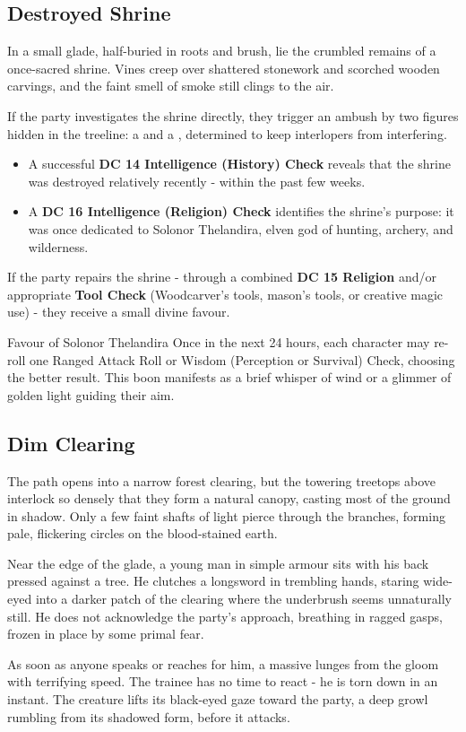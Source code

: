 \subsection*{ Destroyed Shrine}
{\entryfont In a small glade, half-buried in roots and brush, lie the crumbled remains of a once-sacred shrine. Vines creep over shattered stonework and scorched wooden carvings, and the faint smell of smoke still clings to the air.

If the party investigates the shrine directly, they trigger an ambush by two figures hidden in the treeline: a \hyperref[monster:BanditArcher]{} and a \hyperref[monster:BanditDruid]{}, determined to keep interlopers from interfering.
\begin{itemize}
	\item A successful \textbf{DC 14 Intelligence (History) Check} reveals that the shrine was destroyed relatively recently - within the past few weeks.
	\item A \textbf{DC 16 Intelligence (Religion) Check} identifies the shrine's purpose: it was once dedicated to Solonor Thelandira, elven god of hunting, archery, and wilderness.
\end{itemize}
If the party repairs the shrine - through a combined \textbf{DC 15 Religion} and/or appropriate \textbf{Tool Check} (Woodcarver's tools, mason's tools, or creative magic use) - they receive a small divine favour.}
\begingroup
	\DndSetThemeColor[PhbMauve]
	\begin{DndComment}{Favour of Solonor Thelandira}
		Once in the next 24 hours, each character may re-roll one Ranged Attack Roll or Wisdom (Perception or Survival) Check, choosing the better result. This boon manifests as a brief whisper of wind or a glimmer of golden light guiding their aim.
	\end{DndComment}
\endgroup
\subsection*{ Dim Clearing}
{\entryfont The path opens into a narrow forest clearing, but the towering treetops above interlock so densely that they form a natural canopy, casting most of the ground in shadow. Only a few faint shafts of light pierce through the branches, forming pale, flickering circles on the blood-stained earth.

Near the edge of the glade, a young man in simple armour sits with his back pressed against a tree. He clutches a longsword in trembling hands, staring wide-eyed into a darker patch of the clearing where the underbrush seems unnaturally still. He does not acknowledge the party's approach, breathing in ragged gasps, frozen in place by some primal fear.

As soon as anyone speaks or reaches for him, a massive \hyperref[monster:ShadowMastiff]{} lunges from the gloom with terrifying speed. The trainee has no time to react - he is torn down in an instant. The creature lifts its black-eyed gaze toward the party, a deep growl rumbling from its shadowed form, before it attacks.}
